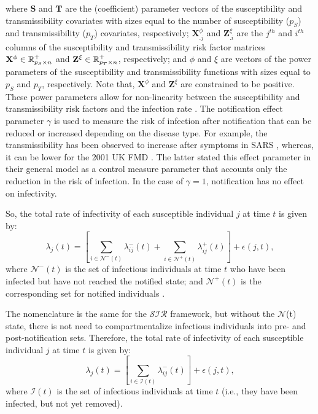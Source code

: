 \documentclass[nojss,shortnames]{jss}
\begin{document}
\noindent where $\mathbf{S}$ and $\mathbf{T}$ are the (coefficient) parameter vectors of the susceptibility and transmissibility covariates with sizes equal to the number of susceptibility ($p_S$) and transmissibility ($p_T$) covariates, respectively; $\mathbf{X}^{\phi}_{.j}$ and $\mathbf{Z}^{\xi}_{.i}$ are the $j^{th}$ and $i^{th}$ columns of the susceptibility and transmissibility risk factor matrices $\mathbf{X}^{\phi} \in \Bbb R_{p_{S}\times n}^{+}$ and $\mathbf{Z}^{\xi} \in \Bbb R_{p_{T}\times n}^{+}$, respectively; and $\phi$ and $\xi$ are vectors of the power parameters of the susceptibility and transmissibility functions with sizes equal to $p_S$ and $p_T$, respectively. Note that, $\mathbf{X}^{\phi}$ and $\mathbf{Z}^{\xi}$ are constrained to be positive.
These power parameters allow for non-linearity between the susceptibility and transmissibility risk factors and the infection rate \citep{deardon2010inference}. The notification effect parameter $\gamma$ is used to measure the risk of infection after notification that can be reduced or increased depending on the disease type. For example, the transmissibility has been observed to increase after symptoms in SARS \citep{pitzer2007estimating}, whereas, it can be lower for the 2001 UK FMD \citep{jewell2009bayesian}. The latter stated this effect parameter in their general model as a control measure parameter that accounts only the reduction in the risk of infection. In the case of $\gamma=1$, notification has no effect on infectivity.

So, the total rate of infectivity of each susceptible individual $j$ at time $t$ is given by:
\begin{equation}
\lambda_{j}(t) = \left[\sum_{i \in \mathcal{N}^{-}{(t)}}{\lambda_{ij}^{-}(t)} + \sum_{i \in \mathcal{N}^{+}{(t)}}{\lambda_{ij}^{+}(t)} \right] + \epsilon(j,t),
\label{ratesinr}
\end{equation}
\noindent where $\mathcal{N}^{-}{(t)}$ is the set of infectious individuals at time $t$ who have been infected but have not reached the notified state; and $\mathcal{N}^{+}{(t)}$ is the corresponding set for notified individuals \citep{jewell2009bayesian}.

The nomenclature is the same for the $\mathcal{SIR}$ framework, but without the $\mathcal{N}$(t) state, there is not need to compartmentalize infectious individuals into pre- and post-notification sets. Therefore, the total rate of infectivity of each susceptible individual $j$ at time $t$ is given by:
\begin{equation}
\lambda_{j}(t) = \left[ \sum_{i \in \mathcal{I}{(t)}}{\lambda_{ij}^{-}(t)} \right]+ \epsilon(j,t) ,
\label{ratesir}
\end{equation}
\noindent where $\mathcal{I}{(t)}$ is the set of infectious individuals at time $t$ (i.e., they have been infected, but not yet removed).
\end{document}
